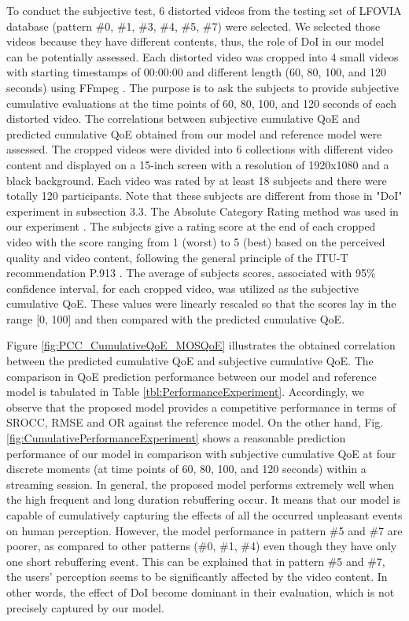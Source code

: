 To conduct the subjective test, 6 distorted videos from the testing set of LFOVIA database (pattern \#0, \#1, \#3, \#4, \#5, \#7) were selected. We selected those videos because they have different contents, thus, the role of DoI in our model can be potentially assessed. Each distorted video was cropped into 4 small videos with starting timestamps of 00:00:00 and different length (60, 80, 100, and 120 seconds) using FFmpeg \cite{FFmpeg}. The purpose is to ask the subjects to provide subjective cumulative evaluations at the time points of 60, 80, 100, and 120 seconds of each distorted video. The correlations between subjective cumulative QoE and predicted cumulative QoE obtained from our model and reference model were assessed. The cropped videos were divided into 6 collections with different video content and displayed on a 15-inch screen with a resolution of 1920x1080 and a black background. Each video was rated by at least 18 subjects and there were totally 120 participants. Note that these subjects are different from those in "DoI" experiment in subsection 3.3. The Absolute Category Rating method was used in our experiment \cite{ITUT_P913}. The subjects give a rating score at the end of each cropped video with the score ranging from 1 (worst) to 5 (best) based on the perceived quality and video content, following the general principle of the ITU-T recommendation P.913 \cite{ITUT_P913}. The average of subjects scores, associated with 95\% confidence interval, for each cropped video, was utilized as the subjective cumulative QoE. These values were linearly rescaled so that the scores lay in the range [0, 100] and then compared with the predicted cumulative QoE.

Figure \ref{fig:PCC_CumulativeQoE_MOSQoE} illustrates the obtained correlation between the predicted cumulative QoE and subjective cumulative QoE. The comparison in QoE prediction performance between our model and reference model is tabulated in Table \ref{tbl:PerformanceExperiment}. Accordingly, we observe that the proposed model provides a competitive performance in terms of SROCC, RMSE and OR against the reference model. On the other hand, Fig. \ref{fig:CumulativePerformanceExperiment} shows a reasonable prediction performance of our model in comparison with subjective cumulative QoE at four discrete moments (at time points of 60, 80, 100, and 120 seconds) within a streaming session. In general, the proposed model performs extremely well when the high frequent and long duration rebuffering occur. It means that our model is capable of cumulatively capturing the effects of all the occurred unpleasant events on human perception. However, the model performance in pattern \#5 and \#7 are poorer, as compared to other patterns (\#0, \#1, \#4) even though they have only one short rebuffering event. This can be explained that in pattern \#5 and \#7, the users' perception seems to be significantly affected by the video content. In other words, the effect of DoI become dominant in their evaluation, which is not precisely captured by our model.
